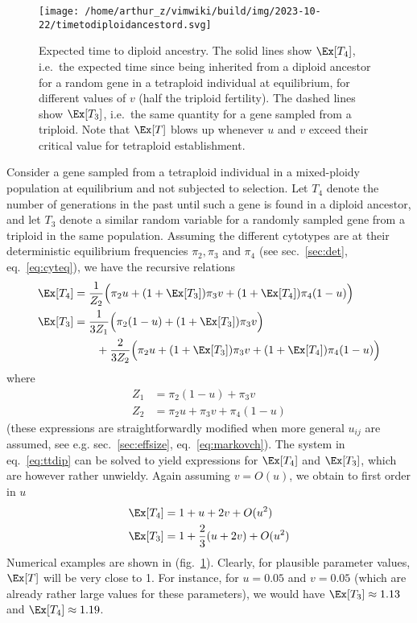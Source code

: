 \begin{figure}
\centering
\texttt{[image: /home/arthur\_z/vimwiki/build/img/2023-10-22/timetodiploidancestord.svg]}
\caption{Expected time to diploid ancestry. The solid lines show
\(\Ex[T_4]\), i.e.~the expected time since being inherited from a
diploid ancestor for a random gene in a tetraploid individual at
equilibrium, for different values of \(v\) (half the triploid
fertility). The dashed lines show \(\Ex[T_3]\), i.e.~the same quantity
for a gene sampled from a triploid. Note that \(\Ex[T]\) blows up
whenever \(u\) and \(v\) exceed their critical value for tetraploid
establishment. \label{fig:ttdip}}
\end{figure}

Consider a gene sampled from a tetraploid individual in a mixed-ploidy
population at equilibrium and not subjected to selection. Let \(T_4\)
denote the number of generations in the past until such a gene is found
in a diploid ancestor, and let \(T_3\) denote a similar random variable
for a randomly sampled gene from a triploid in the same population.
Assuming the different cytotypes are at their deterministic equilibrium
frequencies \(\pi_2, \pi_3\) and \(\pi_4\) (see sec.~\ref{sec:det},
eq.~\ref{eq:cyteq}), we have the recursive relations \begin{align}
  \Ex[T_4] &= \frac{1}{Z_2}\Big(\pi_2u + (1+\Ex[T_3])\pi_3 v +
    (1+\Ex[T_4])\pi_4(1-u)\Big) \nonumber \\
  \Ex[T_3] &= \frac{1}{3Z_1}\Big(\pi_2(1-u) + (1+\Ex[T_3])\pi_3 v\Big)
  \nonumber
    \\ &\qquad + \frac{2}{3Z_2}\Big(\pi_2 u + (1+\Ex[T_3])\pi_3 v +
      (1+\Ex[T_4])\pi_4(1-u)\Big) \label{eq:ttdip}
\end{align} where \begin{align*}
  Z_1 &= \pi_2(1-u) + \pi_3v \\
  Z_2 &= \pi_2u + \pi_3v + \pi_4(1-u)
\end{align*} (these expressions are straightforwardly modified when more
general \(u_{ij}\) are assumed, see e.g. sec.~\ref{sec:effsize},
eq.~\ref{eq:markovch}). The system in eq.~\ref{eq:ttdip} can be solved
to yield expressions for \(\Ex[T_4]\) and \(\Ex[T_3]\), which are
however rather unwieldy. Again assuming \(v=O(u)\), we obtain to first
order in \(u\) \begin{align*}
\Ex[T_4] &= 1 + u + 2v + O(u^2) \\
\Ex[T_3] &= 1 + \frac{2}{3}(u + 2v) + O(u^2) 
\end{align*} Numerical examples are shown in (fig.~\ref{fig:ttdip}).
Clearly, for plausible parameter values, \(\Ex[T]\) will be very close
to 1. For instance, for \(u=0.05\) and \(v=0.05\) (which are already
rather large values for these parameters), we would have
\(\Ex[T_3] \approx 1.13\) and \(\Ex[T_4] \approx 1.19\).

